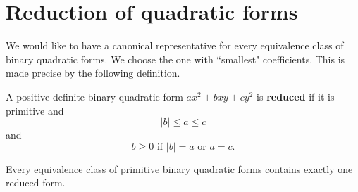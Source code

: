 \section{Reduction of quadratic forms}
We would like to have a canonical representative for every equivalence class of binary quadratic forms. We choose the one with ``smallest" coefficients. This is made precise by the following definition.
\begin{df}
A positive definite binary quadratic form $ax^2+bxy+cy^2$ is \textbf{reduced} if it is primitive and
\[
|b|\le a\le c
\]
and
\[
b\ge 0\text{ if } |b|=a\text{ or }a=c.
\]
\end{df}
\begin{thm}
Every equivalence class of primitive binary quadratic forms contains exactly one reduced form.
\end{thm}
